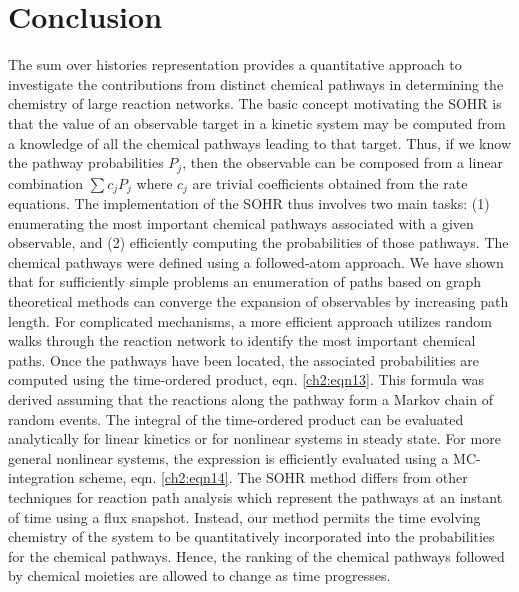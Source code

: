 \chapter{Conclusion}
\label{chapter5}
The sum over histories representation provides a quantitative approach to investigate
the contributions from distinct chemical pathways in determining the chemistry of large
reaction networks. The basic concept motivating the SOHR is that the value of an
observable target in a kinetic system may be computed from a knowledge of all the
chemical pathways leading to that target. Thus, if we know the pathway probabilities
$P_j$, then the observable can be composed from a linear combination $\sum{c_jP_j}$ where $c_j$ are
trivial coefficients obtained from the rate equations. The implementation of the SOHR
thus involves two main tasks: (1) enumerating the most important chemical pathways
associated with a given observable, and (2) efficiently computing the probabilities of
those pathways. The chemical pathways were defined using a followed-atom approach.
We have shown that for sufficiently simple problems an enumeration of paths based on
graph theoretical methods can converge the expansion of observables by increasing
path length. For complicated mechanisms, a more efficient approach utilizes random
walks through the reaction network to identify the most important chemical paths. Once
the pathways have been located, the associated probabilities are computed using the
time-ordered product, eqn. \ref{ch2:eqn13}. This formula was derived assuming that the
reactions along the pathway form a Markov chain of random events. The integral of
the time-ordered product can be evaluated analytically for linear kinetics or for nonlinear
systems in steady state. For more general nonlinear systems, the expression is efficiently
evaluated using a MC-integration scheme, eqn. \ref{ch2:eqn14}. The SOHR method
differs from other techniques for reaction path analysis which represent the pathways at
an instant of time using a flux snapshot.\cite{ch1_IRPC_32_chemkin201115112} Instead, our method permits the time
evolving chemistry of the system to be quantitatively incorporated into the probabilities
for the chemical pathways. Hence, the ranking of the chemical pathways followed by
chemical moieties are allowed to change as time progresses.
\newline
